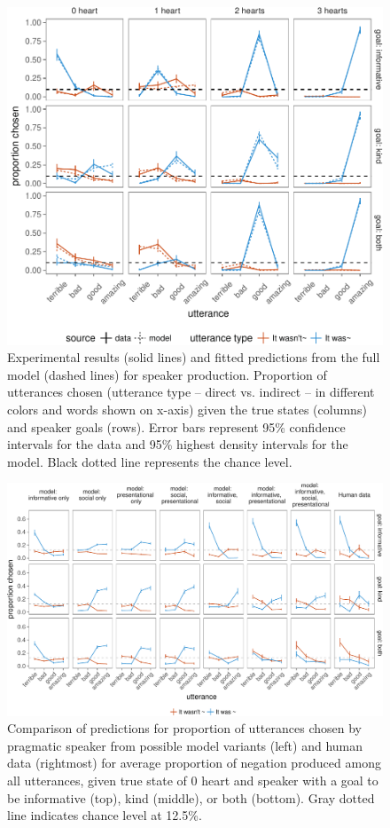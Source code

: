 \documentclass[12pt]{article}
\begin{document}
\begin{figure}[!h]
\includegraphics[width=\textwidth]{polite_manuscript_files/figure-latex/utterance-1} \caption{Experimental results (solid lines) and fitted predictions from the full model (dashed lines) for speaker production. Proportion of utterances chosen (utterance type – direct vs. indirect – in different colors and words shown on x-axis) given the true states (columns) and speaker goals (rows). Error bars represent 95\% confidence intervals for the data and 95\% highest density intervals for the model. Black dotted line represents the chance level.}\label{fig:utterance}
\end{figure}

\begin{figure}[!h]
\includegraphics[width=\textwidth]{polite_manuscript_files/figure-latex/comparisonAll-1} \caption{Comparison of predictions for proportion of utterances chosen by pragmatic speaker from possible model variants (left) and human data (rightmost) for average proportion of negation produced among all utterances, given true state of 0 heart and speaker with a goal to be informative (top), kind (middle), or both (bottom). Gray dotted line indicates chance level at 12.5\%.}\label{fig:comparisonAll}
\end{figure}
\end{document}
